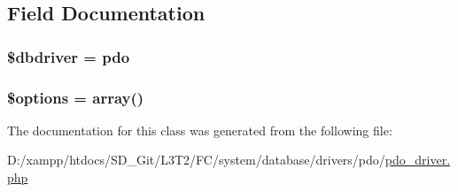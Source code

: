 \subsection{Field Documentation}
\hypertarget{class_c_i___d_b__pdo__driver_a0cde2a16322a023d040aa7f725877597}{}
\subsubsection[{\$dbdriver}]{\setlength{\rightskip}{0pt plus 5cm}\$dbdriver = \textquotesingle{}pdo\textquotesingle{}}\label{class_c_i___d_b__pdo__driver_a0cde2a16322a023d040aa7f725877597}
\hypertarget{class_c_i___d_b__pdo__driver_a011800c63ece4cbbfa77136a20607023}{}
\subsubsection[{\$options}]{\setlength{\rightskip}{0pt plus 5cm}\$options = array()}\label{class_c_i___d_b__pdo__driver_a011800c63ece4cbbfa77136a20607023}


The documentation for this class was generated from the following file\+:\begin{DoxyCompactItemize}
\item 
D\+:/xampp/htdocs/\+S\+D\+\_\+\+Git/\+L3\+T2/\+F\+C/system/database/drivers/pdo/\hyperlink{pdo__driver_8php}{pdo\+\_\+driver.\+php}\end{DoxyCompactItemize}
